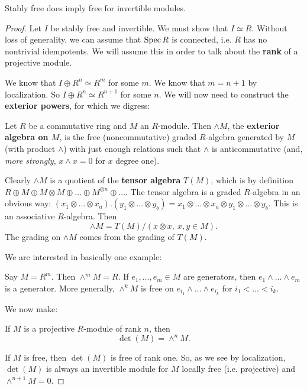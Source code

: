 \begin{proposition} 
Stably free does imply free for invertible modules. 
\end{proposition} 
\begin{proof} 
Let $I$ be stably free and invertible. We must show that $I \simeq R$.
Without loss of generality, we can assume that $\operatorname{Spec} R$ is connected, i.e.
$R$ has no nontrivial idempotents. We will assume this in order to talk about
the \textbf{rank} of a projective module.

We know that $I \oplus R^n \simeq R^m$ for some $m$. We know that $m=n+1$ by
localization. So $I \oplus R^n \simeq R^{n+1}$ for some $n$.
We will now need to construct the \textbf{exterior powers}, for which we
digress:

\begin{definition} 
Let $R$ be a commutative ring and $M$ an $R$-module. Then $\wedge M$, the
\textbf{exterior algebra on $M$}, is the free (noncommutative) graded $R$-algebra
generated by $M$ (with product $\wedge$) with just enough relations such that
$\wedge$ is anticommutative (and, \emph{more strongly}, $x \wedge x=0$ for
$x$ degree one).
\end{definition} 

Clearly $\wedge M$ is a quotient of the \textbf{tensor algebra} $T(M)$, which is by
definition $R
\oplus M \oplus M \otimes M \oplus \dots \oplus M^{\otimes n} \oplus \dots$.
The tensor algebra is a graded $R$-algebra in an obvious way: $(x_1 \otimes
\dots \otimes x_a) . (y_1 \otimes \dots \otimes y_b) = x_1 \otimes \dots
\otimes x_a \otimes y_1 \otimes \dots \otimes y_b$. This is an associative
$R$-algebra. 
Then 
\[ \wedge M = T(M)/( x \otimes x, \ x,y \in M).  \]
The grading on $\wedge M$ comes from the grading of $T(M)$. 

We are interested in basically one example:
\begin{example} 
Say $M = R^m$. Then $\wedge^m M = R$. If $e_1, \dots, e_m \in M$ are
generators, then $e_1 \wedge \dots \wedge e_m$ is a generator. More generally,
$\wedge^k M$ is free on $e_{i_1} \wedge \dots \wedge e_{i_k}$ for $i_1 < \dots <
i_k$.
\end{example} 

We now make:

\begin{definition} 
If $M$ is a projective $R$-module of rank $n$, then 
\[ \det(M) = \wedge^n M.  \]
\end{definition} 
If $M$ is free, then $\det(M)$ is free of rank one. So, as we see by
localization, $\det(M)$ is always an
invertible module for $M$ locally free (i.e. projective) and $\wedge^{n+1}M = 0$.


\end{proof}
